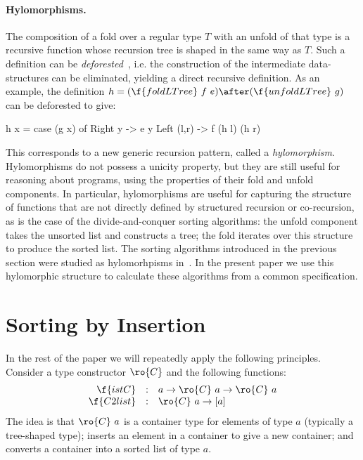 \documentclass[a4paper,11pt]{llncs}
\begin{document}
\paragraph{Hylomorphisms.}

The composition of a fold over a regular type $T$ with an unfold of
that type is a recursive function whose recursion tree is shaped in
the same way as $T$. Such a definition can be
\emph{deforested}~\cite{WadlerP:dtpet}, i.e. the construction of the
intermediate data-structures can be eliminated, yielding a direct
recursive definition. As an example, the definition $h =
(\f{foldLTree}\ f\ e) \after (\f{unfoldLTree}\ g)$ can be deforested
to give:
\begin{code}
h x = case (g x) of
      Right y    -> e y
      Left (l,r) -> f (h l) (h r)
\end{code}

This corresponds to a new generic recursion pattern, called a
\emph{hylomorphism}. Hylomorphisms do not possess a unicity property,
but they are still useful for reasoning about programs, using the
properties of their fold and unfold components.
In particular, hylomorphisms are useful for capturing the structure of
functions that are not directly defined by structured recursion or
co-recursion, as is the case of the divide-and-conquer sorting
algorithms: the unfold component takes the unsorted list and
constructs a tree; the fold iterates over this structure to produce
the sorted list.
The sorting algorithms introduced in the previous section were studied
as hylomorhpisms in~\cite{AugusteijnL:sorm}. In the present paper we
use this hylomorphic structure to calculate these algorithms from a
common specification.






\section{Sorting by Insertion}
\label{sec:sori}

In the rest of the paper we will repeatedly apply the following
principles. Consider a type constructor $\ro{C}$ and the following
functions:
$$
\begin{array}{rcl}
  \f{istC} & : & a \to \ro{C}\ a \to \ro{C}\ a\\
  \f{C2list} & : & \ro{C}\ a \to [a]
\end{array}
$$
The idea is that $\ro{C}\ a$ is a container type for elements of type
$a$ (typically a tree-shaped type);
 inserts an element in a container to give a new container;
and  converts a container into a sorted list of type
$a$. 
\end{document}
